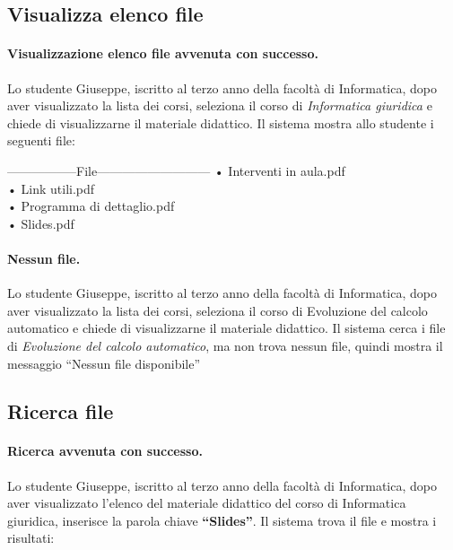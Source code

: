 \subsection{Visualizza elenco file}
\paragraph{Visualizzazione elenco file avvenuta con successo.}
Lo studente Giuseppe, iscritto al terzo anno della facoltà di Informatica, dopo aver visualizzato la lista dei corsi, seleziona il corso di \textit{Informatica giuridica} e chiede di visualizzarne il materiale didattico. Il sistema mostra allo studente i seguenti file: 

\begin{tabbing}
	\hspace{1cm}-----------------File---------------------------\kill
	\hspace{1cm} • Interventi in aula.pdf  \\
	\hspace{1cm} • Link utili.pdf  \\
	\hspace{1cm} • Programma di dettaglio.pdf  \\	
	\hspace{1cm} • Slides.pdf  \\
\end{tabbing} 

\paragraph{Nessun file.}
 Lo studente Giuseppe, iscritto al terzo anno della facoltà di Informatica, dopo aver visualizzato la lista dei corsi, seleziona il corso di Evoluzione del calcolo automatico  e chiede di visualizzarne il materiale didattico. Il sistema cerca i file di \textit{Evoluzione del calcolo automatico}, ma non trova nessun file, quindi mostra il messaggio “Nessun file disponibile”
 
\subsection{Ricerca file}
\paragraph{Ricerca avvenuta con successo.}
Lo studente Giuseppe, iscritto al terzo anno della  facoltà di Informatica, dopo aver visualizzato l’elenco del materiale didattico del corso di Informatica giuridica, inserisce la parola chiave \textbf{“Slides”}. Il sistema trova il file e mostra i risultati:   

